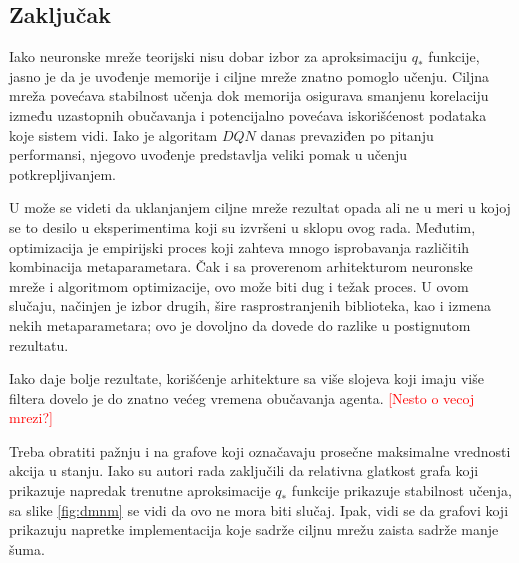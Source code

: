 \subsection{Zaključak}

Iako neuronske mreže teorijski nisu dobar izbor za aproksimaciju $q_*$ funkcije, jasno je da je uvođenje memorije i ciljne mreže znatno pomoglo učenju. Ciljna mreža povećava stabilnost učenja dok memorija osigurava smanjenu korelaciju između uzastopnih obučavanja i potencijalno povećava iskorišćenost podataka koje sistem vidi. Iako je algoritam $DQN$ danas prevaziđen po pitanju performansi, njegovo uvođenje predstavlja veliki pomak u učenju potkrepljivanjem.
\par 
U \cite{dqn_dm} može se videti da uklanjanjem ciljne mreže rezultat opada ali ne u meri u kojoj se to desilo u eksperimentima koji su izvršeni u sklopu ovog rada. Međutim, optimizacija je empirijski proces koji zahteva mnogo isprobavanja različitih kombinacija metaparametara. Čak i sa proverenom arhitekturom neuronske mreže i algoritmom optimizacije, ovo može biti dug i težak proces. U ovom slučaju, načinjen je izbor drugih, šire rasprostranjenih biblioteka, kao i izmena nekih metaparametara; ovo je dovoljno da dovede do razlike u postignutom rezultatu.
\par 
Iako daje bolje rezultate, korišćenje arhitekture sa više slojeva koji imaju više filtera dovelo je do znatno većeg vremena obučavanja agenta. 
\textcolor{red}{[Nesto o vecoj mrezi?]}
\par 
Treba obratiti pažnju i na grafove koji označavaju prosečne maksimalne vrednosti akcija u stanju. Iako su autori rada \cite{dqn_mnih} zaključili da relativna glatkost grafa koji prikazuje napredak trenutne aproksimacije $q_*$ funkcije prikazuje stabilnost učenja, sa slike \ref{fig:dmnm} se vidi da ovo ne mora biti slučaj. Ipak, vidi se da grafovi koji prikazuju napretke implementacija koje sadrže ciljnu mrežu zaista sadrže manje šuma.